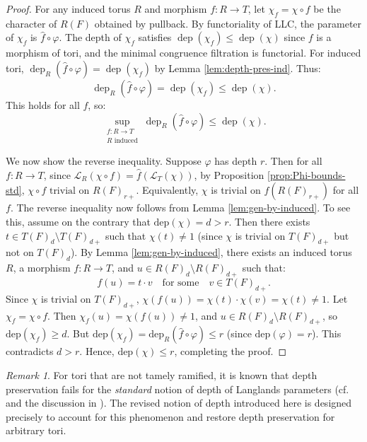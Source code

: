 \documentclass[american]{article}
\numberwithin{equation}{section}
\numberwithin{figure}{section}
\theoremstyle{plain}
\theoremstyle{definition}
\theoremstyle{remark}
\newtheorem{remark}[theorem]{Remark}
\begin{document}
\begin{proof}
  For any induced torus \(R\) and morphism \(f: R \to T\), let \(\chi_f = \chi \circ f\) be the character of \(R(F)\) obtained by pullback. By functoriality of LLC, the parameter of \(\chi_f\) is \(\hat{f} \circ \varphi\). The depth of \(\chi_f\) satisfies \(\operatorname{dep}(\chi_f) \leq \operatorname{dep}(\chi)\) since \(f\) is a morphism of tori, and the minimal congruence filtration is functorial. For induced tori, \(\operatorname{dep}_R(\hat{f} \circ \varphi) = \operatorname{dep}(\chi_f)\) by Lemma \ref{lem:depth-pres-ind}. Thus:
  \[
  \operatorname{dep}_R(\hat{f} \circ \varphi) = \operatorname{dep}(\chi_f) \leq \operatorname{dep}(\chi).
  \]
  This holds for all \(f\), so:
  \[
  \sup_{\substack{f: R \to T \\ R \text{ induced}}} \operatorname{dep}_R(\hat{f} \circ \varphi) \leq \operatorname{dep}(\chi). \tag{I}
  \]

We now show the reverse inequality. 
Suppose $\varphi$ has depth \(r\).  Then for all $f:R\rightarrow T$, since \(\mathcal{L}_R(\chi \circ f) = \widehat{f}(\mathcal{L}_T(\chi)) \), by Proposition \ref{prop:Phi-bounds-std},  \( \chi \circ f \text{ trivial on } R(F)_{r+}\). Equivalently, $\chi$ is trivial on $f(R(F)_{r+})$ for all $f$. The reverse inequality now follows from Lemma \ref{lem:gen-by-induced}. To see this, assume on the contrary that \(\text{dep}(\chi) = d > r\).  Then there exists \(t \in T(F)_d \setminus T(F)_{d+}\) such that \(\chi(t) \neq 1\) (since \(\chi\) is trivial on \(T(F)_{d+}\) but not on \(T(F)_d\)).  By Lemma \ref{lem:gen-by-induced}, there exists an induced torus \(R\), a morphism \(f: R \to T\), and \(u \in R(F)_d \setminus R(F)_{d+}\) such that:  
  \[
  f(u) = t \cdot v \quad \text{for some} \quad v \in T(F)_{d+}.
  \] Since \(\chi\) is trivial on \(T(F)_{d+}\), \(\chi(f(u)) = \chi(t) \cdot \chi(v) = \chi(t) \neq 1\).  Let \(\chi_f = \chi \circ f\). Then \(\chi_f(u) = \chi(f(u)) \neq 1\), and \(u \in R(F)_d \setminus R(F)_{d+}\), so \(\text{dep}(\chi_f) \geq d\).  But \(\text{dep}(\chi_f) = \text{dep}_R(\widehat{f} \circ \varphi) \leq r\) (since \(\text{dep}(\varphi) = r\)).  This contradicts \(d > r\). Hence, \(\text{dep}(\chi) \leq r\), completing the proof.
\end{proof}
\begin{remark}
For tori that are not tamely ramified, it is known that depth preservation fails
for the \emph{standard} notion of depth of Langlands parameters
(cf.\ \cite{aubert2017,MishraPattanayak2015} and the discussion in \cite{DeBackerChenTsai}).
The revised notion of depth introduced here is designed precisely to account for
this phenomenon and restore depth preservation for arbitrary tori.
\end{remark}
\end{document}
